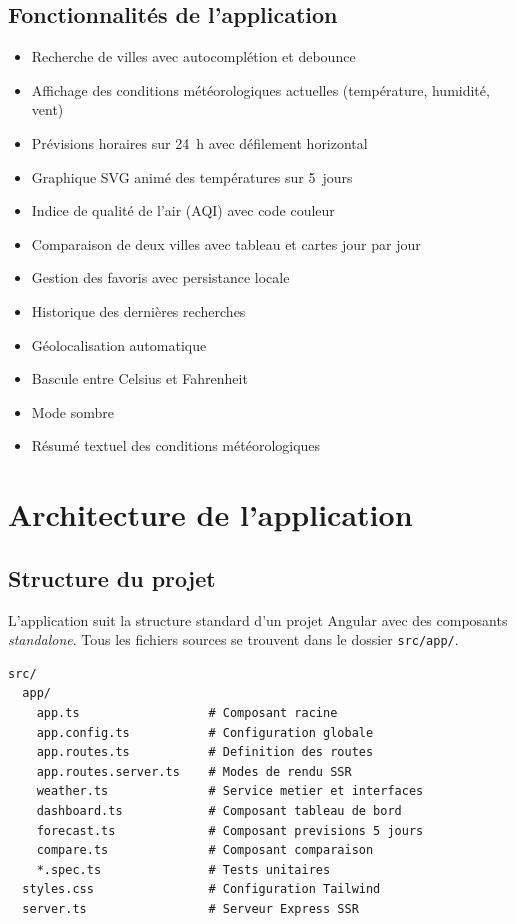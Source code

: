 \documentclass[12pt,a4paper]{article}
\begin{document}
\subsection{Fonctionnalités de l'application}

\begin{itemize}[nosep]
    \item Recherche de villes avec autocomplétion et debounce
    \item Affichage des conditions météorologiques actuelles (température, humidité, vent)
    \item Prévisions horaires sur 24~h avec défilement horizontal
    \item Graphique SVG animé des températures sur 5~jours
    \item Indice de qualité de l'air (AQI) avec code couleur
    \item Comparaison de deux villes avec tableau et cartes jour par jour
    \item Gestion des favoris avec persistance locale
    \item Historique des dernières recherches
    \item Géolocalisation automatique
    \item Bascule entre Celsius et Fahrenheit
    \item Mode sombre
    \item Résumé textuel des conditions météorologiques
\end{itemize}

\newpage
\section{Architecture de l'application}
\label{sec:archi}

\subsection{Structure du projet}

L'application suit la structure standard d'un projet Angular avec des composants \emph{standalone}. Tous les fichiers sources se trouvent dans le dossier \texttt{src/app/}.

\begin{lstlisting}[style=bash, caption={Arborescence du projet}]
src/
  app/
    app.ts                  # Composant racine
    app.config.ts           # Configuration globale
    app.routes.ts           # Definition des routes
    app.routes.server.ts    # Modes de rendu SSR
    weather.ts              # Service metier et interfaces
    dashboard.ts            # Composant tableau de bord
    forecast.ts             # Composant previsions 5 jours
    compare.ts              # Composant comparaison
    *.spec.ts               # Tests unitaires
  styles.css                # Configuration Tailwind
  server.ts                 # Serveur Express SSR
\end{lstlisting}
\end{document}
